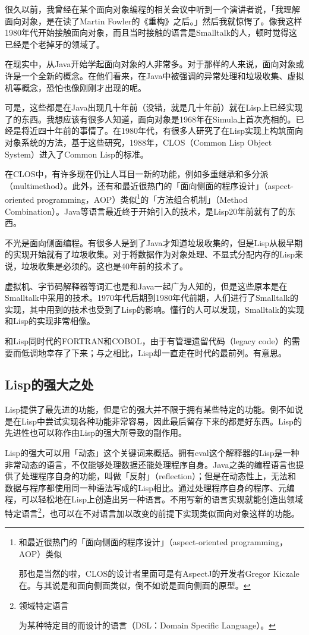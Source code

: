 \documentclass[a4paper,12pt]{article}
\begin{document}
很久以前，我曾经在某个面向对象编程的相关会议中听到一个演讲者说，「我理解面向对象，是在读了Martin Fowler的《重构》之后。」然后我就惊愕了。像我这样1980年代开始接触面向对象，而且当时接触的语言是Smalltalk的人，顿时觉得这已经是个老掉牙的领域了。

在现实中，从Java开始学起面向对象的人非常多。对于那样的人来说，面向对象或许是一个全新的概念。在他们看来，在Java中被强调的异常处理和垃圾收集、虚拟机等概念，恐怕也像刚刚才出现的呢。

可是，这些都是在Java出现几十年前（没错，就是几十年前）就在Lisp上已经实现了的东西。我想应该有很多人知道，面向对象是1968年在Simula上首次亮相的。已经是将近四十年前的事情了。在1980年代，有很多人研究了在Lisp实现上构筑面向对象系统的方法，基于这些研究，1988年，CLOS（Common Lisp Object System）进入了Common Lisp的标准。

在CLOS中，有许多现在仍让人耳目一新的功能，例如多重继承和多分派（multimethod）。此外，还有和最近很热门的「面向侧面的程序设计」（aspect-oriented programming，AOP）类似\footnote{和最近很热门的「面向侧面的程序设计」（aspect-oriented programming，AOP）类似

那也是当然的啦，CLOS的设计者里面可是有AspectJ的开发者Gregor Kiczale在。与其说是和面向侧面类似，倒不如说是面向侧面的原型。}的「方法组合机制」（Method Combination）。Java等语言最近终于开始引入的技术，是Lisp20年前就有了的东西。

不光是面向侧面编程。有很多人是到了Java才知道垃圾收集的，但是Lisp从极早期的实现开始就有了垃圾收集。对于将数据作为对象处理、不显式分配内存的Lisp来说，垃圾收集是必须的。这也是40年前的技术了。

虚拟机、字节码解释器等词汇也是和Java一起广为人知的，但是这些原本是在Smalltalk中采用的技术。1970年代后期到1980年代前期，人们进行了Smalltalk的实现，其中用到的技术也受到了Lisp的影响。懂行的人可以发现，Smalltalk的实现和Lisp的实现非常相像。

和Lisp同时代的FORTRAN和COBOL，由于有管理遗留代码（legacy code）的需要而低调地幸存了下来；与之相比，Lisp却一直走在时代的最前列。有意思。

\subsection{Lisp的强大之处}

Lisp提供了最先进的功能，但是它的强大并不限于拥有某些特定的功能。倒不如说是在Lisp中尝试实现各种功能非常容易，因此最后留存下来的都是好东西。Lisp的先进性也可以称作由Lisp的强大所导致的副作用。

Lisp的强大可以用「动态」这个关键词来概括。拥有eval这个解释器的Lisp是一种非常动态的语言，不仅能够处理数据还能处理程序自身。Java之类的编程语言也提供了处理程序自身的功能，叫做「反射」（reflection）；但是在动态性上，无法和数据与程序都使用同一种语法写成的Lisp相比。通过处理程序自身的程序、元编程，可以轻松地在Lisp上创造出另一种语言。不用写新的语言实现就能创造出领域特定语言\footnote{领域特定语言

为某种特定目的而设计的语言（DSL：Domain Specific Language）。}，也可以在不对语言加以改变的前提下实现类似面向对象这样的功能。
\end{document}
